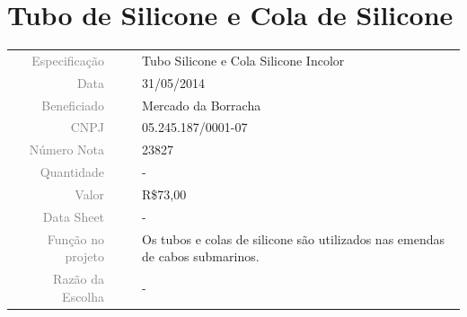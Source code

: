 

\section{Tubo de Silicone e Cola de Silicone}
\label{borracha}


\begin{table}[ht!]

	\begin{tabular}{r l|l p{12cm} }
		
		\textcolor{gray}{Especificação} &&& 	{Tubo Silicone e Cola Silicone
		Incolor}\\
		\textcolor{gray}{Data} &&& 				{31/05/2014}\\
        \textcolor{gray}{Beneficiado} &&&		{Mercado da Borracha} \\
        \textcolor{gray}{CNPJ} &&& 				{05.245.187/0001-07} \\
        \textcolor{gray}{Número Nota} &&& 		{23827} \\
		\textcolor{gray}{Quantidade} &&& 		{-} \\
		\textcolor{gray}{Valor} &&& 			{R\$73,00} \\
		\textcolor{gray}{Data Sheet} &&& 		{-} \\

		\textcolor{gray}{Função no projeto} &&& {Os tubos e colas de silicone são
		utilizados nas emendas de cabos submarinos.}
		\\
		\textcolor{gray}{Razão da Escolha} &&& {-}
		

	\end{tabular}
\end{table}

\newpage

